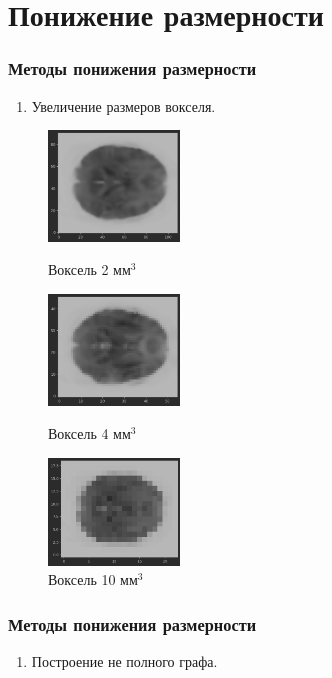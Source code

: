 \documentclass{beamer}
\makeatletter
\newcommand\setItemnumber[1]{\setcounter{enum\romannumeral\@enumdepth}{\numexpr#1-1\relax}}
\makeatother
\begin{document}
	\section{Понижение размерности}
	\begin{frame} 
		\frametitle{Методы понижения размерности}				
			\begin{enumerate}				
				\item Увеличение размеров вокселя.					
			\end{enumerate}
		
			\begin{figure}
				\begin{minipage}{3.5cm}
					\includegraphics[width=3.5cm]{../images/downsampling2mm_1.png}
					\caption{Воксель 2 мм$^3$}
					\label{fg:5}
				\end{minipage}\hfill
				\begin{minipage}{3.5cm}
					\includegraphics[width=3.5cm]{../images/downsampling4mm_2.png}
					\caption{Воксель 4 мм$^3$}
					\label{fg:6}
				\end{minipage}\hfill
				\begin{minipage}{3.5cm}
					\includegraphics[width=3.5cm]{../images/downsampling10mm_3.png}
					\caption{Воксель 10 мм$^3$}
					\label{fg:7}
				\end{minipage}
			\end{figure}	
	\end{frame}

	\begin{frame} 
		\frametitle{Методы понижения размерности}				
		\begin{enumerate}				
			\setItemnumber{2}
			\item Построение не полного графа.					
		\end{enumerate}
		
		\begin{figure}
			
		\end{figure}	
	\end{frame}
\end{document}
